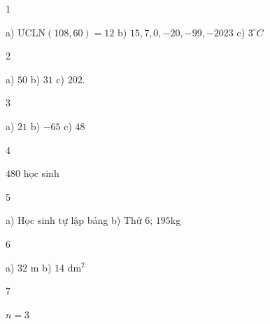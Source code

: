 \begin{Solbook}{1}
 \par \noindent a) ƯCLN$(108, 60) = 12$ \hfill b) $15, 7, 0, -20, -99, -2023$ \hfill c) $3^{\circ } C$  \hfill \qedEX 
\end{Solbook}
\begin{Solbook}{2}
 \par \noindent a) $50$ \hfill b) $31$ \hfill c) $202$.  \hfill \qedEX 
\end{Solbook}
\begin{Solbook}{3}
 \par \noindent a) $21$ \hfill b) $-65$ \hfill c) $48$ \hfill \qedEX 
\end{Solbook}
\begin{Solbook}{4}
 \par \noindent $480$ học sinh \hfill \qedEX 
\end{Solbook}
\begin{Solbook}{5}
 \par \noindent a) Học sinh tự lập bảng \hfill b) Thứ $6$; $195$kg  \hfill \qedEX 
\end{Solbook}
\begin{Solbook}{6}
 \par \noindent a) $32$ m \hfill b) $14$ dm$^2$  \hfill \qedEX 
\end{Solbook}
\begin{Solbook}{7}
 \par \noindent $n = 3$ \hfill \qedEX 
\end{Solbook}
